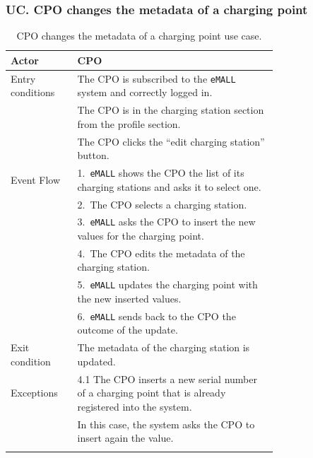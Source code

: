 \subsubsection*{UC\cuc . CPO changes the metadata of a charging point}
\begin{center}
    \begin{longtable}{lp{0.75\linewidth}}
        \hline
        Actor            & CPO                                                                                         \\
        \hline
        Entry conditions & The CPO is subscribed to the \verb|eMALL| system and correctly logged in.                   \\
        & The CPO is in the charging station section from the profile section.                        \\
        & The CPO clicks the “edit charging station” button.                                          \\
        \hline
        Event Flow       & 1.\ \verb|eMALL| shows the CPO the list of its charging stations and asks it to select one. \\
        & 2.\ The CPO selects a charging station.                                                     \\
        & 3.\ \verb|eMALL| asks the CPO to insert the new values for the charging point.              \\
        & 4.\ The CPO edits the metadata of the charging station.                                     \\
        & 5.\ \verb|eMALL| updates the charging point with the new inserted values.                   \\
        & 6.\ \verb|eMALL| sends back to the CPO the outcome of the update.                           \\
        \hline
        Exit condition   & The metadata of the charging station is updated.                                            \\
        \hline
        Exceptions       & 4.1 The CPO inserts a new serial number of a charging point that is already registered into the system. \\
        & In this case, the system asks the CPO to insert again the value.                                        \\
        \hline
        \caption{CPO changes the metadata of a charging point use case.}
        \label{tab: CPO_updates_charging_point_use_case}
    \end{longtable}


\end{center}
